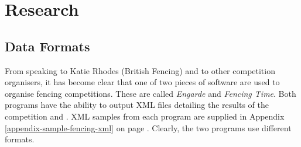 \chapter{Research} \label{research}

\section{Data Formats}
From speaking to Katie Rhodes (British Fencing) and to other competition
organisers, it has become clear that one of two pieces of software are used to
organise fencing competitions. These are called \textit{Engarde} and
\textit{Fencing Time}. Both programs have the ability to output XML files
detailing the results of the competition \citep{engardewebsite} and
\citep{fencingtimewebsite}. XML samples from each program are supplied in
Appendix \ref{appendix-sample-fencing-xml} on page
\pageref{appendix-sample-fencing-xml}. Clearly, the two programs use different
formats.

